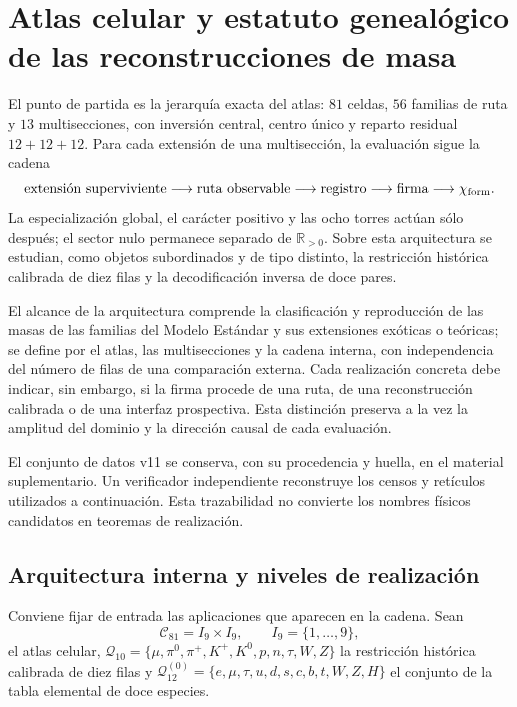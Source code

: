 \chapter[Atlas celular y reconstrucciones de masa]{Atlas celular y estatuto genealógico de las reconstrucciones de masa}
\label{chap:atlas-genealogia-masas}

El punto de partida es la jerarquía exacta del atlas: \(81\) celdas,
\(56\) familias de ruta y \(13\) multisecciones, con inversión central,
centro único y reparto residual \(12+12+12\). Para cada extensión de una
multisección, la evaluación sigue la cadena
\[
\text{extensión superviviente}\longrightarrow\text{ruta observable}
\longrightarrow\text{registro}\longrightarrow\text{firma}
\longrightarrow\chi_{\rm form}.
\]
La especialización global, el carácter positivo y las ocho torres actúan sólo
después; el sector nulo permanece separado de
\(\mathbb R_{>0}\). Sobre esta arquitectura se estudian, como objetos
subordinados y de tipo distinto, la restricción histórica calibrada de diez
filas y la decodificación inversa de doce pares.

El alcance de la arquitectura comprende la clasificación y reproducción de
las masas de las familias del Modelo Estándar y sus extensiones exóticas o
teóricas; se define por el atlas, las multisecciones y la cadena interna, con
independencia del número de filas de una comparación externa. Cada realización
concreta debe indicar, sin embargo, si la firma
procede de una ruta, de una reconstrucción calibrada o de una interfaz
prospectiva. Esta distinción preserva a la vez la amplitud del dominio y la
dirección causal de cada evaluación.

El conjunto de datos v11 se conserva, con su procedencia y huella, en el
material suplementario. Un verificador independiente reconstruye los censos y
retículos utilizados a continuación. Esta trazabilidad no convierte los
nombres físicos candidatos en teoremas de realización.

\section{Arquitectura interna y niveles de realización}

Conviene fijar de entrada las aplicaciones que aparecen en la cadena. Sean
\[
 \mathcal C_{81}=I_9\times I_9,
 \qquad I_9=\{1,\ldots,9\},
\]
el atlas celular, 
\(
 \mathcal Q_{10}=\{\mu,\pi^0,\pi^+,K^+,K^0,p,n,\tau,W,Z\}
\)
la restricción histórica calibrada de diez filas y
\(
 \mathcal Q_{12}^{(0)}=\{e,\mu,\tau,u,d,s,c,b,t,W,Z,H\}
\)
el conjunto de la tabla elemental de doce especies.

